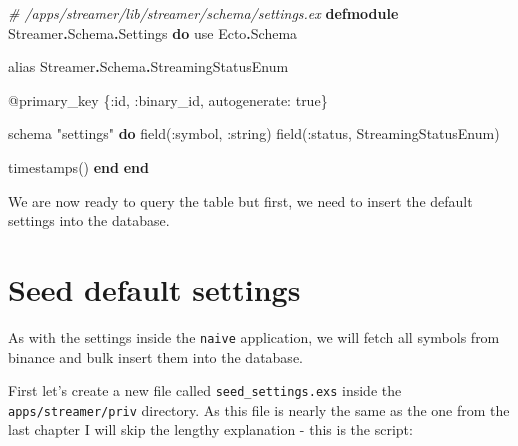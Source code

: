 \documentclass[
  oneside]{book}
\newenvironment{Shaded}{\begin{snugshade}}{\end{snugshade}}
\newcommand{\CommentTok}[1]{\textcolor[rgb]{0.56,0.35,0.01}{\textit{#1}}}
\newcommand{\ConstantTok}[1]{\textcolor[rgb]{0.00,0.00,0.00}{#1}}
\newcommand{\ImportTok}[1]{#1}
\newcommand{\KeywordTok}[1]{\textcolor[rgb]{0.13,0.29,0.53}{\textbf{#1}}}
\newcommand{\NormalTok}[1]{#1}
\newcommand{\OperatorTok}[1]{\textcolor[rgb]{0.81,0.36,0.00}{\textbf{#1}}}
\newcommand{\OtherTok}[1]{\textcolor[rgb]{0.56,0.35,0.01}{#1}}
\newcommand{\StringTok}[1]{\textcolor[rgb]{0.31,0.60,0.02}{#1}}
\newcommand{\VariableTok}[1]{\textcolor[rgb]{0.00,0.00,0.00}{#1}}
\begin{document}
\begin{Shaded}
\begin{Highlighting}[]
\CommentTok{\# /apps/streamer/lib/streamer/schema/settings.ex}
\KeywordTok{defmodule} \ConstantTok{Streamer}\OperatorTok{.}\ConstantTok{Schema}\OperatorTok{.}\ConstantTok{Settings} \KeywordTok{do}
  \ImportTok{use} \ConstantTok{Ecto}\OperatorTok{.}\ConstantTok{Schema}

  \ImportTok{alias} \ConstantTok{Streamer}\OperatorTok{.}\ConstantTok{Schema}\OperatorTok{.}\ConstantTok{StreamingStatusEnum}

  \OtherTok{@primary\_key}\NormalTok{ \{}\VariableTok{:id}\NormalTok{, }\VariableTok{:binary\_id}\NormalTok{, }\VariableTok{autogenerate:} \ConstantTok{true}\NormalTok{\}}

\NormalTok{  schema }\StringTok{"settings"} \KeywordTok{do}
\NormalTok{    field(}\VariableTok{:symbol}\NormalTok{, }\VariableTok{:string}\NormalTok{)}
\NormalTok{    field(}\VariableTok{:status}\NormalTok{, }\ConstantTok{StreamingStatusEnum}\NormalTok{)}

\NormalTok{    timestamps()}
  \KeywordTok{end}
\KeywordTok{end}
\end{Highlighting}
\end{Shaded}

We are now ready to query the table but first, we need to insert the default settings into the database.

\hypertarget{seed-default-settings}{%
\section{Seed default settings}\label{seed-default-settings}}

As with the settings inside the \texttt{naive} application, we will fetch all symbols from binance and bulk insert them into the database.

First let's create a new file called \texttt{seed\_settings.exs} inside the \texttt{apps/streamer/priv} directory. As this file is nearly the same as the one from the last chapter I will skip the lengthy explanation - this is the script:
\end{document}
